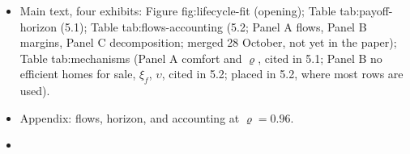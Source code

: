 \begin{itemize}
  \item Main text, four exhibits: Figure fig:lifecycle-fit (opening);
    Table tab:payoff-horizon (5.1); Table tab:flows-accounting (5.2; Panel
    A flows, Panel B margins, Panel C decomposition; merged 28 October,
    not yet in the paper); Table tab:mechanisms (Panel A comfort and $\varrho$,
    cited in 5.1; Panel B no efficient homes for sale, $\xi_f$, $\upsilon$,
    cited in 5.2; placed in 5.2, where most rows are used).
  \item Appendix: flows, horizon, and accounting at $\varrho=0.96$.
  \item {}
\end{itemize}
